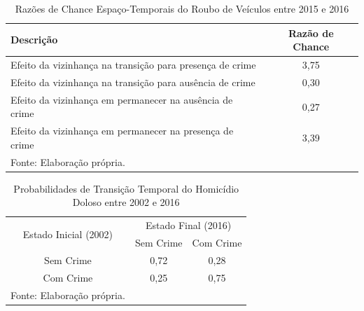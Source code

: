 \documentclass[12pt,openright,oneside,a4paper,english,french,spanish]{abntex2}
\numberwithin{table}{section} %
\numberwithin{figure}{section} %
\begin{document}
\begin{subappendices}
\begin{table}[H]
\centering
\caption{Razões de Chance Espaço-Temporais do Roubo de Veículos entre 2015 e 2016}
        \begin{tabular}{lc}
            \hline
            {\textbf{Descrição}} & {\textbf{Razão de Chance}} \\\hline
            {Efeito da vizinhança na transição para presença de crime} & {3,75} \\
            {Efeito da vizinhança na transição para ausência de crime} & {0,30} \\
            {Efeito da vizinhança em permanecer na ausência de crime} & {0,27} \\
            {Efeito da vizinhança em permanecer na presença de crime} & {3,39} \\\hline
            \tiny Fonte: Elaboração própria.
        \end{tabular}
    \label{tab:odds_espaco_tempo_roub_vei_2015_2016}
\end{table}




















\begin{table}[H]
\centering
\caption{Probabilidades de Transição Temporal do Homicídio Doloso entre 2002 e 2016}
        \begin{tabular}{ccc}
            \hline
            \multirow{2}{*}{Estado Inicial (2002)} & \multicolumn{2}{c}{Estado Final (2016)}  \\\cline{2-3} 
                                     & \multicolumn{1}{l}{Sem Crime} & \multicolumn{1}{l}{Com Crime} \\\hline
            {Sem Crime} & {0,72} & {0,28} \\                \hline
            {Com Crime} & {0,25} & {0,75} \\                \hline
            \tiny Fonte: Elaboração própria.
        \end{tabular}
    \label{tab:prob_tempo_hom_dol_2002_2016}
\end{table}


\end{subappendices}
\end{document}
